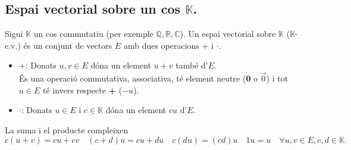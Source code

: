 \documentclass[11pt]{article}
\begin{document}
\subsection{Espai vectorial sobre un cos $\mathbb{K}$.}
Sigui $\mathbb{K}$ un cos commutatiu (per exemple $\mathbb{Q},\mathbb{R},\mathbb{C}$). Un espai vectorial sobre $\mathbb{K}$ ($\mathbb{K}$-e.v.) és un conjunt de vectors $E$ amb dues operacions $+$ i $\cdot$.
\begin{itemize}
	\item $\textbf{+}$: Donats $u,v\in E$ dóna un element $u+v$ també d'$E$.\\ És una operació commutativa, associativa, té element neutre (\textbf{0} o $\vec{0}$) i tot $u\in E$ té invers respecte \textbf{+} ($-u$).
	\item $\textbf{·}$: Donats $u\in E$ i $c\in\mathbb{K}$ dóna un element $cu$ d'$E$.
\end{itemize}
La suma i el producte compleixen
$$c(u+v)=cu+cv \quad (c+d)u=cu+du \quad c(du)=(cd)u \quad 1u=u \quad \forall u,v\in E, c,d\in\mathbb{K}.$$

\newpage
\end{document}
